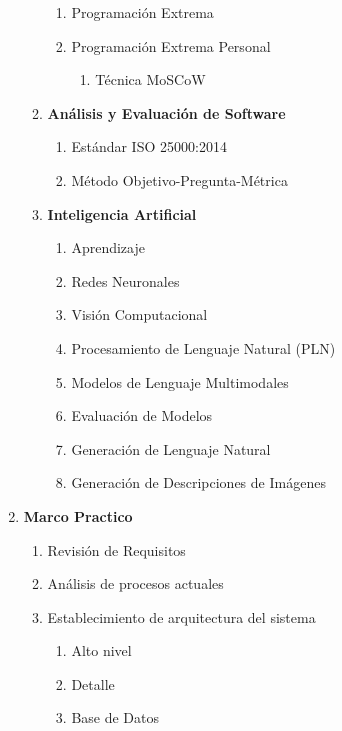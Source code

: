 \begin{enumerate}[label*=\arabic*.]
\begin{enumerate}[label*=\arabic*.]
\begin{enumerate}[label*=\arabic*.]
            \item Programación Extrema
            \item Programación Extrema Personal
            \begin{enumerate}[label*=\arabic*.]
                \item Técnica MoSCoW
            \end{enumerate}
        \end{enumerate}
        \item \textbf{Análisis y Evaluación de Software}
        \begin{enumerate}[label*=\arabic*.]
            \item Estándar ISO 25000:2014
            \item Método Objetivo-Pregunta-Métrica
        \end{enumerate}
        \item \textbf{Inteligencia Artificial}
        \begin{enumerate}[label*=\arabic*.]
            \item Aprendizaje
            \item Redes Neuronales
            \item Visión Computacional
            \item Procesamiento de Lenguaje Natural (PLN)
            \item Modelos de Lenguaje Multimodales
            \item Evaluación de Modelos
            \item Generación de Lenguaje Natural
            \item Generación de Descripciones de Imágenes
        \end{enumerate}
    \end{enumerate}
    \item \textbf{Marco Practico}
        \begin{enumerate}[label*=\arabic*.]
            \item Revisión de Requisitos
            \item Análisis de procesos actuales
            \item Establecimiento de arquitectura del sistema
            \begin{enumerate}[label*=\arabic*.]
                \item Alto nivel
                \item Detalle
                \item Base de Datos
            \end{enumerate}   

\end{enumerate}
\end{enumerate}
